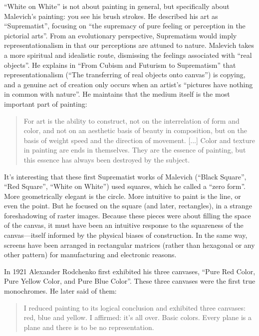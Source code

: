 \documentclass{thesis}
\begin{document}
``White on White'' is not about painting in general, but specifically about Malevich's painting: you see his brush strokes. He described his art as ``Suprematist'', focusing on ``the supremacy of pure feeling or perception in the pictorial arts''. From an evolutionary perspective, Suprematism would imply representationalism in that our perceptions are attuned to nature. Malevich takes a more spiritual and idealistic route, dismissing the feelings associated with ``real objects''. He explains in ``From Cubism and Futurism to Suprematism'' that representationalism (``The transferring of real objects onto canvas'') is copying, and a genuine act of creation only occurs when an artist's ``pictures have nothing in common with nature''. He maintains that the medium itself is the most important part of painting:
	
	\begin{quote}
	For art is the ability to construct, not on the interrelation of form and color, and not on an aesthetic basis of beauty in composition, but on the basis of weight speed and the direction of movement. [...] Color and texture in painting are ends in themselves. They are the essence of painting, but this essence has always been destroyed by the subject.
	\end{quote}
	
It's interesting that these first Suprematist works of Malevich (``Black Square'', ``Red Square'', ``White on White'') used squares, which he called a ``zero form''. More geometrically elegant is the circle. More intuitive to paint is the line, or even the point. But he focused on the square (and later, rectangles), in a strange foreshadowing of raster images. Because these pieces were about filling the space of the canvas, it must have been an intuitive response to the squareness of the canvas---itself informed by the physical biases of construction. In the same way, screens have been arranged in rectangular matrices (rather than hexagonal or any other pattern) for manufacturing and electronic reasons.
	
	\cite{moma_rodchenko_1998}
	In 1921 Alexander Rodchenko first exhibited his three canvases, ``Pure Red Color, Pure Yellow Color, and Pure Blue Color''. These three canvases were the first true monochromes. He later said of them:
	
	\begin{quote}
	I reduced painting to its logical conclusion and exhibited three canvases: red, blue and yellow. I affirmed: it's all over. Basic colors. Every plane is a plane and there is to be no representation.
	\end{quote}
	
\end{document}
